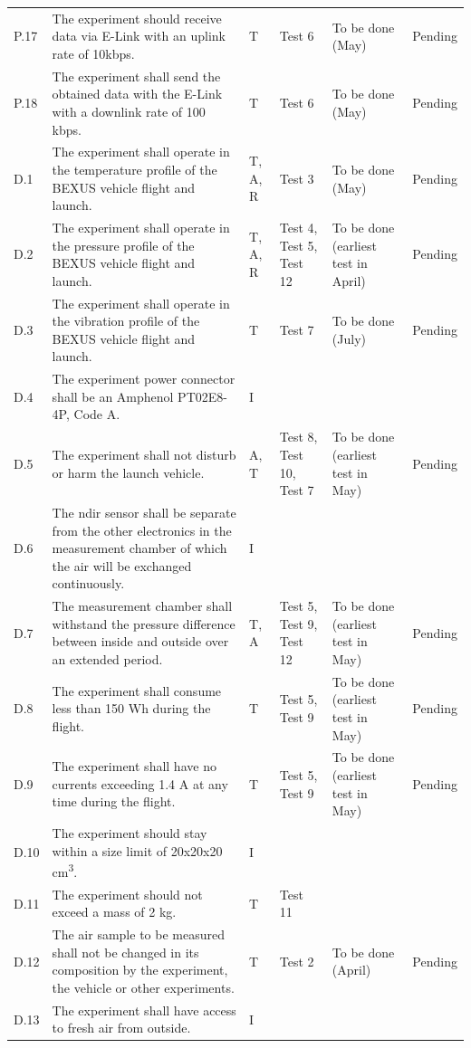 \documentclass[12pt,a4paper]{report}
\begin{document}
\begin{longtable}{L{0.7cm}L{5cm}L{1.5cm}L{2cm}L{2.5cm}L{2cm}}
P.17 & The experiment should receive data via E-Link with an uplink rate of 10kbps. & T & Test 6 & To be done (May) & Pending \\
P.18 & The experiment shall send the obtained data with the E-Link with a downlink rate of 100 kbps. & T & Test 6 & To be done (May) & Pending \\
D.1 & The experiment shall operate in the temperature profile of the BEXUS vehicle flight and launch. & T, A, R & Test 3 & To be done (May) & Pending \\
D.2 & The experiment shall operate in the pressure profile of the BEXUS vehicle flight and launch. & T, A, R & Test 4, Test 5, Test 12 & To be done (earliest test in April) & Pending \\
D.3 & The experiment shall operate in the vibration profile of the BEXUS vehicle flight and launch. & T & Test 7 & To be done (July) & Pending \\
D.4 & The experiment power connector shall be an Amphenol PT02E8-4P, Code A. & I & & & \\
D.5 & The experiment shall not disturb or harm the launch vehicle. & A, T & Test 8, Test 10, Test 7 & To be done (earliest test in May) & Pending \\
D.6 & The \ac{ndir} sensor shall be separate from the other electronics in the measurement chamber of which the air will be exchanged continuously. & I & & & \\
D.7 & The measurement chamber shall withstand the pressure difference between inside and outside over an extended period. & T, A & Test 5, Test 9, Test 12 & To be done (earliest test in May) & Pending \\
D.8 & The experiment shall consume less than 150 Wh during the flight. & T & Test 5, Test 9 & To be done (earliest test in May) & Pending \\
D.9 & The experiment shall have no currents exceeding 1.4 A at any time during the flight. & T & Test 5, Test 9 & To be done (earliest test in May) & Pending \\
D.10 & The experiment should stay within a size limit of 20x20x20 cm\textsuperscript{3}. & I & & & \\
D.11 & The experiment should not exceed a mass of 2 kg. & T & Test 11 & & \\
D.12 & The air sample to be measured shall not be changed in its composition by the experiment, the vehicle or other experiments. & T & Test 2 & To be done (April) & Pending \\
D.13 & The experiment shall have access to fresh air from outside. & I & & & \\

\end{longtable}
\end{document}
